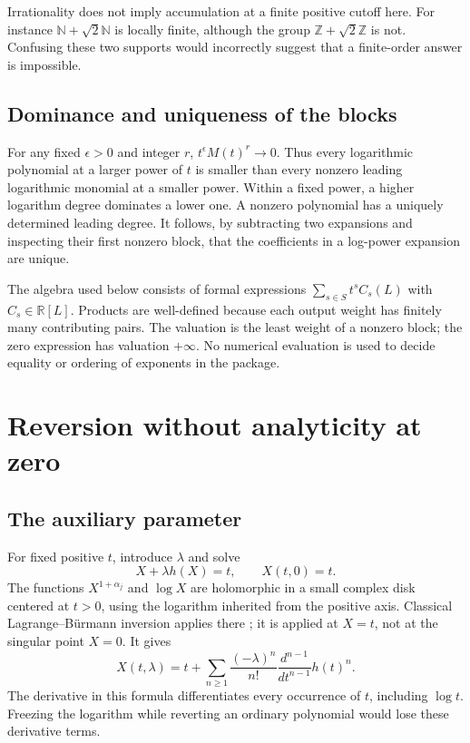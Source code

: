 \documentclass[11pt,a4paper]{article}
\newcommand{\R}{\mathbb R}
\newcommand{\N}{\mathbb N}
\theoremstyle{definition}
\begin{document}
Irrationality does not imply accumulation at a finite positive cutoff here.
For instance \(\N+\sqrt2\N\) is locally finite, although the group
\(\mathbb Z+\sqrt2\mathbb Z\) is not. Confusing these two supports would
incorrectly suggest that a finite-order answer is impossible.

\subsection{Dominance and uniqueness of the blocks}
For any fixed \(\epsilon>0\) and integer \(r\),
\(t^\epsilon M(t)^r\to0\). Thus every logarithmic polynomial at a larger
power of \(t\) is smaller than every nonzero leading logarithmic monomial at
a smaller power. Within a fixed power, a higher logarithm degree dominates
a lower one. A nonzero polynomial has a uniquely determined leading degree.
It follows, by subtracting two expansions and inspecting their first nonzero
block, that the coefficients in a log-power expansion are unique.

The algebra used below consists of formal expressions
\(\sum_{s\in S}t^s C_s(L)\) with \(C_s\in\R[L]\). Products are well-defined
because each output weight has finitely many contributing pairs. The
valuation is the least weight of a nonzero block; the zero expression has
valuation \(+\infty\). No numerical evaluation is used to decide equality or
ordering of exponents in the package.

\section{Reversion without analyticity at zero}
\subsection{The auxiliary parameter}
For fixed positive \(t\), introduce \(\lambda\) and solve
\begin{equation}\label{eq:homotopy}
 X+\lambda h(X)=t,\qquad X(t,0)=t.
\end{equation}
The functions \(X^{1+\alpha_j}\) and \(\log X\) are holomorphic in a small
complex disk centered at \(t>0\), using the logarithm inherited from the
positive axis. Classical Lagrange--B\"urmann inversion applies there
\cite[\S1.10(vii)]{dlmf}; it is applied at \(X=t\), not at the singular point
\(X=0\). It gives
\begin{equation}\label{eq:lagrange}
 X(t,\lambda)=t+
 \sum_{n\ge1}\frac{(-\lambda)^n}{n!}
 \frac{d^{n-1}}{dt^{n-1}}h(t)^n.
\end{equation}
The derivative in this formula differentiates every occurrence of \(t\),
including \(\log t\). Freezing the logarithm while reverting an ordinary
polynomial would lose these derivative terms.
\end{document}
